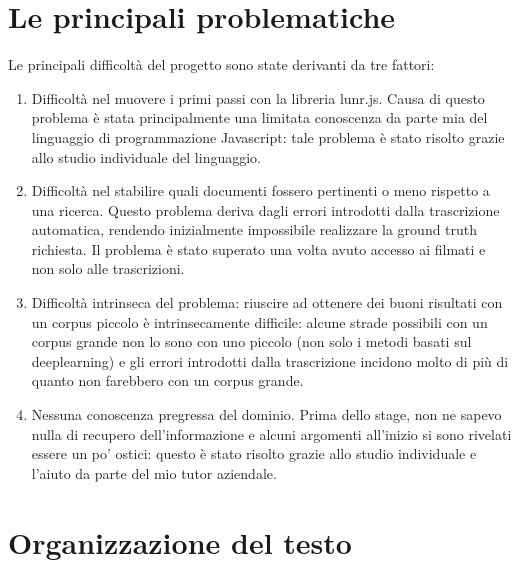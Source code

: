 \section{Le principali problematiche}
\label{sec:problematiche}
Le principali difficoltà del progetto sono state derivanti da tre fattori:
\begin{enumerate}
    \item Difficoltà nel muovere i primi passi con la libreria lunr.js. Causa di questo problema è stata principalmente una limitata conoscenza da parte mia del linguaggio di programmazione Javascript: tale problema è stato risolto grazie allo studio individuale del linguaggio.
    \item Difficoltà nel stabilire quali documenti fossero pertinenti o meno rispetto a una ricerca. Questo problema deriva dagli errori introdotti dalla trascrizione automatica, rendendo inizialmente impossibile realizzare la ground truth richiesta. Il problema è stato superato una volta avuto accesso ai filmati e non solo alle trascrizioni.
    \item Difficoltà intrinseca del problema: riuscire ad ottenere dei buoni risultati con un corpus piccolo è intrinsecamente difficile: alcune strade possibili con un corpus grande non lo sono con uno piccolo (non solo i metodi basati sul deeplearning) e gli errori introdotti dalla trascrizione incidono molto di più di quanto non farebbero con un corpus grande. 
    \item Nessuna conoscenza pregressa del dominio. Prima dello stage, non ne sapevo nulla di recupero dell'informazione e alcuni argomenti all'inizio si sono rivelati essere un po' ostici: questo è stato risolto grazie allo studio individuale e l'aiuto da parte del mio tutor aziendale. 
\end{enumerate}

\section{Organizzazione del testo}

